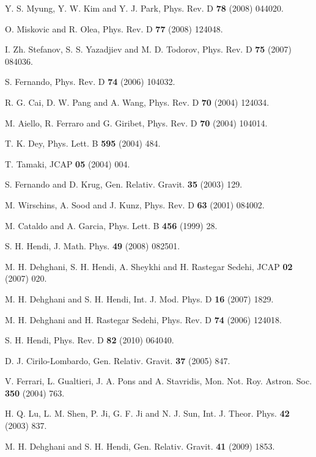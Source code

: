 \documentclass[aps,onecolumn ]{revtex4}
\begin{document}
\begin{thebibliography}{99}
 Y. S. Myung, Y. W. Kim and Y. J. Park, Phys. Rev. D \textbf{78} (2008)
044020.

 O. Miskovic and R. Olea, Phys. Rev. D \textbf{77} (2008)
124048.

 I. Zh. Stefanov, S. S. Yazadjiev and M. D. Todorov, Phys. Rev. D \textbf{75}
(2007) 084036.

 S. Fernando, Phys. Rev. D \textbf{74} (2006)
104032.

 R. G. Cai, D. W. Pang and A. Wang, Phys. Rev. D \textbf{70} (2004)
124034.

 M. Aiello, R. Ferraro and G. Giribet, Phys. Rev. D \textbf{70} (2004)
104014.

 T. K. Dey, Phys. Lett. B \textbf{595} (2004)
484.

 T. Tamaki, JCAP \textbf{05} (2004) 004.

 S. Fernando and D. Krug, Gen. Relativ. Gravit. \textbf{35} (2003)
129.

 M. Wirschins, A. Sood and J. Kunz, Phys. Rev. D \textbf{63} (2001)
084002.

 M. Cataldo and A. Garcia, Phys. Lett. B \textbf{456} (1999) 28.

 S. H. Hendi, J. Math. Phys. \textbf{49} (2008)
082501.

 M. H. Dehghani, S. H. Hendi, A. Sheykhi and H. Rastegar Sedehi,
JCAP \textbf{02} (2007) 020.

 M. H. Dehghani and S. H. Hendi, Int. J. Mod. Phys. D \textbf{16} (2007)
1829.

 M. H. Dehghani and H. Rastegar Sedehi, Phys. Rev. D \textbf{74} (2006)
124018.

 S. H. Hendi, Phys. Rev. D \textbf{82} (2010)
064040.

 D. J. Cirilo-Lombardo, Gen. Relativ. Gravit. \textbf{37} (2005)
847.

 V. Ferrari, L. Gualtieri, J. A. Pons and A. Stavridis, Mon. Not. Roy.
Astron. Soc. \textbf{350} (2004) 763.

 H. Q. Lu, L. M. Shen, P. Ji, G. F. Ji and N. J. Sun, Int.
J. Theor. Phys. \textbf{42} (2003) 837.

 M. H. Dehghani and S. H. Hendi, Gen. Relativ. Gravit. \textbf{41} (2009)
1853.


\end{thebibliography}
\end{document}
